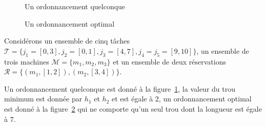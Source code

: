\documentclass[a4paper,11pt]{thesis}
\begin{document}
\begin{figure}
    \begin{center}
        \begin{ordo}{3}{1}{10}


        \end{ordo}
    \end{center}
    \caption{Un ordonnancement quelconque}
    \label{ex1ordquelc}
\end{figure}
            
\begin{figure}
    \begin{center}
        \begin{ordo}{3}{1}{10}


        \end{ordo}
    \end{center}
    \caption{Un ordonnancement optimal}
    \label{ex1ordopt}
\end{figure}

\begin{ex}
    Considérons un ensemble de cinq tâches $\mathcal{T} = \{j_1 = [0, 3], j_2 = [0,1], j_3 = [4,7],
    j_4 = j_5 = [9,10]\}$, un ensemble de trois machines $\mathcal{M} = \{m_1, m_2, m_3\}$ et un
    ensemble de deux réservations $\mathcal{R} = \{(m_1, [1,2]), (m_2, [3,4])\}$.

    Un ordonnancement quelconque est donné à la figure~\ref{ex1ordquelc}, la valeur du trou minimum
    est donnée par $h_1$ et $h_2$ et est égale à $2$, un ordonnancement optimal est donné à la
    figure~\ref{ex1ordopt} qui ne comporte qu'un seul trou dont la longueur est égale à $7$.
\end{ex}

\end{document}
